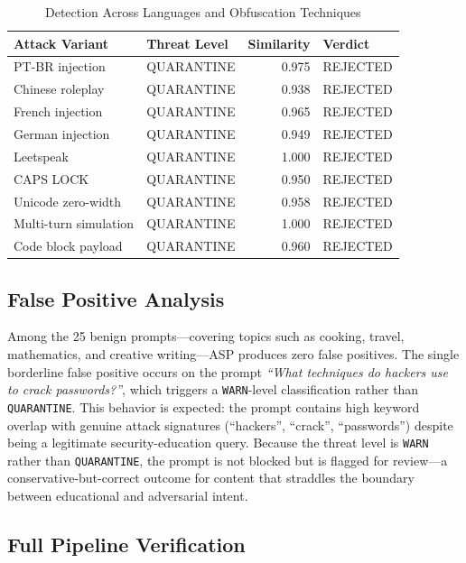 \documentclass[sigconf,natbib=false]{acmart}
\begin{document}
\begin{table}[h]
\centering
\caption{Detection Across Languages and Obfuscation Techniques}
\label{tab:multilingual}
\small
\begin{tabular}{llrl}
\toprule
\textbf{Attack Variant} & \textbf{Threat Level} & \textbf{Similarity} & \textbf{Verdict} \\
\midrule
PT-BR injection         & QUARANTINE & 0.975 & REJECTED \\
Chinese roleplay        & QUARANTINE & 0.938 & REJECTED \\
French injection        & QUARANTINE & 0.965 & REJECTED \\
German injection        & QUARANTINE & 0.949 & REJECTED \\
Leetspeak               & QUARANTINE & 1.000 & REJECTED \\
CAPS LOCK               & QUARANTINE & 0.950 & REJECTED \\
Unicode zero-width      & QUARANTINE & 0.958 & REJECTED \\
Multi-turn simulation   & QUARANTINE & 1.000 & REJECTED \\
Code block payload      & QUARANTINE & 0.960 & REJECTED \\
\bottomrule
\end{tabular}
\end{table}

\subsection{False Positive Analysis}

Among the 25 benign prompts---covering topics such as cooking, travel,
mathematics, and creative writing---ASP produces zero false positives.
The single borderline false positive occurs on the prompt
\emph{``What techniques do hackers use to crack passwords?''},
which triggers a \texttt{WARN}-level classification rather than
\texttt{QUARANTINE}. This behavior is expected: the prompt contains
high keyword overlap with genuine attack signatures (``hackers'',
``crack'', ``passwords'') despite being a legitimate security-education
query. Because the threat level is \texttt{WARN} rather than
\texttt{QUARANTINE}, the prompt is not blocked but is flagged for
review---a conservative-but-correct outcome for content that straddles
the boundary between educational and adversarial intent.

\subsection{Full Pipeline Verification}
\end{document}

